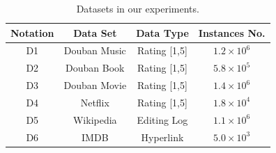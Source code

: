 \begin{table}[!tbp]
\caption{Datasets in our experiments.}
\label{tbl:notationDataset}
\begin{Large}
\begin{center}
\begin{tabular}{ c | c | c |c}
\hline\hline
Notation & Data Set & Data Type & Instances No. \\
\hline \hline
D1 & Douban Music & Rating [1,5]& $1.2 \times 10^6$\\
D2 & Douban Book & Rating [1,5]& $5.8 \times 10^5$ \\
D3 & Douban Movie & Rating [1,5]& $1.4 \times 10^6$ \\
D4 & Netflix & Rating [1,5]& $1.8 \times 10^4$\\
D5 & Wikipedia & Editing Log & $1.1 \times 10^6$\\
D6 & IMDB & Hyperlink & $5.0 \times 10^3$\\
\hline\hline
\end{tabular}
\end{center}
\end{Large}
\end{table}

